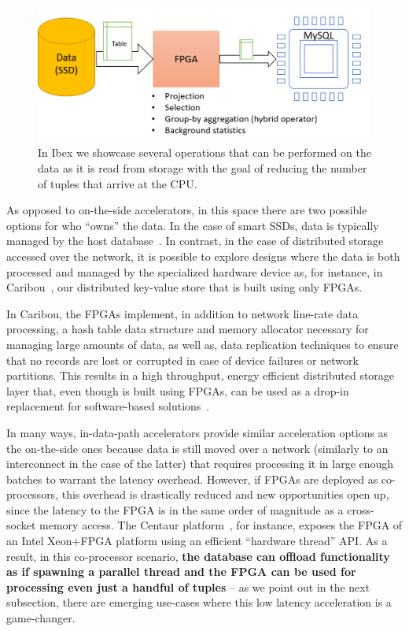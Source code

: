 \documentclass[11pt]{article}
\begin{document}
\begin{figure}[h]
\centering
\includegraphics[width=0.7\linewidth]{figs/Ibex.PNG}
\vspace{-1em}
\caption{In Ibex we showcase several operations that can be performed on the data as it is read from storage with the goal of reducing the number of tuples that arrive at the CPU.\label{fig:Ibex}}
\end{figure}

As opposed to on-the-side accelerators, in this space there are two possible options for who ``owns'' the data. In the case of smart SSDs, data is typically managed by the host database~\cite{jo-yoursql-vldb16}\cite{woods-Ibex-vldb14}. In contrast, in the case of distributed storage accessed over the network, it is possible to explore designs where the data is both processed and managed by the specialized hardware device as, for instance, in Caribou~\cite{istvan-caribou-vldb17}\cite{zistvan-diss-2018}, our distributed key-value store that is built using only FPGAs. 

In Caribou, the FPGAs implement, in addition to network line-rate data processing, a hash table data structure and memory allocator necessary for managing large amounts of data, as well as, data replication techniques to ensure that no records are lost or corrupted in case of device failures or network partitions. This results in a high throughput, energy efficient distributed storage layer that, even though is built using FPGAs, can be used as a drop-in replacement for software-based solutions~\cite{zistvan-diss-2018}.



In many ways, in-data-path accelerators provide similar acceleration options as the on-the-side ones because data is still moved over a network (similarly to an interconnect in the case of the latter) that requires processing it in large enough batches to warrant the latency overhead. However, if FPGAs are deployed as co-processors, this overhead is drastically reduced and new opportunities open up, since the latency to the FPGA is in the same order of magnitude as a cross-socket memory access. The Centaur platform~\cite{owaida-centaur-fccm17}, for instance, exposes the FPGA of an Intel Xeon+FPGA platform using an efficient ``hardware thread'' API. As a result, in this co-processor scenario, \textbf{the database can offload functionality as if spawning a parallel thread and the FPGA can be used for processing even just a handful of tuples} -- as we point out in the next subsection, there are emerging use-cases where this low latency acceleration is a game-changer. 
\end{document}
